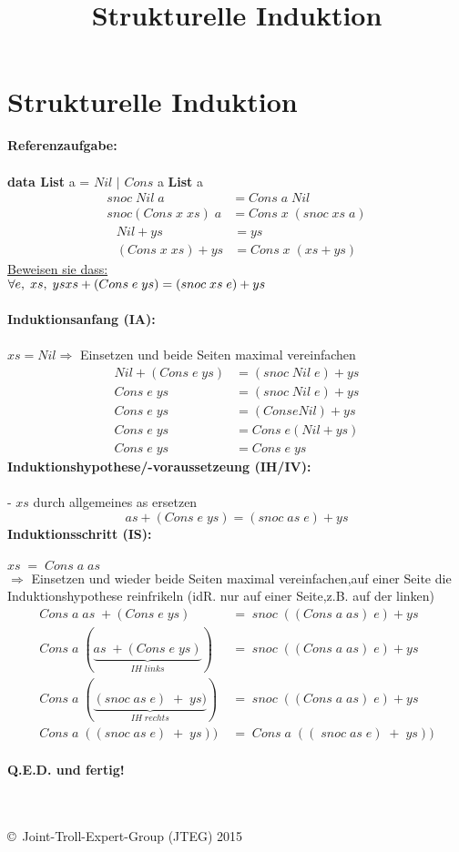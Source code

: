 \documentclass{article}
\title{Strukturelle Induktion}
\date{ }
\begin{document}
	\section*{Strukturelle Induktion}
	\textbf{Referenzaufgabe:} \\
		\\
		\textbf{data List} a = $Nil$ $|$ $Cons$ a \textbf{List} a
		\begin{align*}
			snoc\;Nil\;a 			&= Cons\;a\;Nil\\
			snoc(Cons\;x\;xs)\;a	&= Cons\;x\;(snoc\;xs\;a)
		\end{align*}
		\begin{align*}
			Nil + ys 			&= ys\\
			(Cons\;x\;xs) + ys 	&= Cons\;x\;(xs + ys)
		\end{align*}
		\underline{Beweisen sie dass:}\\
		$\forall e,\;xs,\;ys\\xs+(Cons\;e\;ys) = (snoc\;xs\;e)+ys$ \\\\
	\textbf{Induktionsanfang (IA):}\\\\
		$xs = Nil$\;\;$\Rightarrow$ Einsetzen und beide Seiten maximal vereinfachen
	\begin{align*}
		Nil+(Cons\;e\;ys) 	&= (snoc\;Nil\;e)+ys\\
			 Cons\;e\;ys	&= (snoc\;Nil\;e)+ys\\
			 Cons\;e\;ys	&= (Cons e Nil) + ys\\
			 Cons\;e\;ys	&= Cons\;e (Nil + ys)\\
			 Cons\;e\;ys	&= Cons\;e\;ys
	\end{align*}
	\textbf{Induktionshypothese/-voraussetzeung (IH/IV):}\\\\
	- $xs$ durch allgemeines as ersetzen
	\[as+(Cons\;e\;ys) = (snoc\;as\;e)+ys\]
\newpage
	\textbf{Induktionsschritt (IS):}\\\\
	$xs\;=\;Cons\;a\;as$\\$\Rightarrow$ Einsetzen und wieder beide Seiten maximal vereinfachen,auf einer Seite die Induktionshypothese reinfrikeln (idR. nur auf einer Seite,z.B. auf der linken)
	\begin{align*}
		Cons\;a\;as\;+(Cons\;e\;ys)\;&=\;snoc\;((Cons\;a\;as)\;e)+ys \\
		Cons\;a\;(\underbrace{as\;+(Cons\;e\;ys)}_{IH\;links})\;&=\;snoc\;((Cons\;a\;as)\;e)+ys\\
		Cons\;a\;(\underbrace{(snoc\;as\;e)\;+\;ys)}_{IH\;rechts})\;&=\;snoc\;((Cons\;a\;as)\;e)+ys\\
		Cons\;a\;((snoc\;as\;e)\;+\;ys))\;&=\;Cons\;a\;((\;snoc\;as\;e)\;+\;ys))
	\end{align*}\\
\textbf{Q.E.D. und fertig!}\\
\\\\
	\begin{tiny}
	\copyright\ Joint-Troll-Expert-Group (JTEG) 2015
	\end{tiny}
\end{document}
